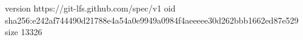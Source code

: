 version https://git-lfs.github.com/spec/v1
oid sha256:e242af744490d21788e4a54a0e9949a0984f4aeeeee30d262bbb1662ed87e529
size 13326
